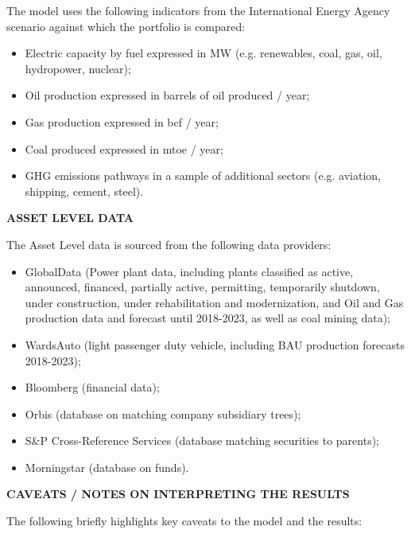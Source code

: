 \documentclass[10pt,twoside,table]{article}\usepackage[]{graphicx}\usepackage[]{color}
\begin{document}
The model uses the following indicators from the International Energy Agency scenario against which the portfolio is compared:
\begin{itemize}
	\item{Electric capacity by fuel expressed in MW (e.g. renewables, coal, gas, oil, hydropower, nuclear);}
	\item{Oil production expressed in barrels of oil produced / year;}
	\item{Gas production expressed in bcf / year;}
	\item{Coal produced expressed in mtoe / year;}
	\item{GHG emissions pathways in a sample of additional sectors (e.g. aviation, shipping, cement, steel).}
\end{itemize}


\textbf{ASSET LEVEL DATA}

The Asset Level data is sourced from the following data providers: 
\begin{itemize}
	\item{GlobalData (Power plant data, including plants classified as active, announced, financed, partially active, permitting, temporarily shutdown, under construction, under rehabilitation and modernization, and Oil and Gas production data and forecast until 2018-2023, as well as coal mining data); }
	\item{WardsAuto (light passenger duty vehicle, including BAU production forecasts 2018-2023); }
	\item{Bloomberg (financial data);}
	\item{Orbis (database on matching company subsidiary trees);}
	\item{S\&P Cross-Reference Services (database matching securities to parents);}
	\item{Morningstar (database on funds). }
	
\end{itemize}

\textbf{CAVEATS / NOTES ON INTERPRETING THE RESULTS }

The following briefly highlights key caveats to the model and the results:
\end{document}
